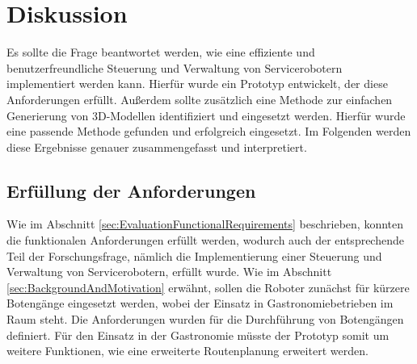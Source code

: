 \newpage
\section{Diskussion}
Es sollte die Frage beantwortet werden, wie eine effiziente und benutzerfreundliche Steuerung und Verwaltung von Servicerobotern implementiert werden kann. Hierfür wurde ein Prototyp entwickelt, der diese Anforderungen erfüllt. Außerdem sollte zusätzlich eine Methode zur einfachen Generierung von 3D-Modellen identifiziert und eingesetzt werden. Hierfür wurde eine passende Methode gefunden und erfolgreich eingesetzt. Im Folgenden werden diese Ergebnisse genauer zusammengefasst und interpretiert.

\subsection{Erfüllung der Anforderungen}
Wie im Abschnitt \ref{sec:EvaluationFunctionalRequirements} beschrieben, konnten die funktionalen Anforderungen erfüllt werden, wodurch auch der entsprechende Teil der Forschungsfrage, nämlich die Implementierung einer Steuerung und Verwaltung von Servicerobotern, erfüllt wurde. Wie im Abschnitt \ref{sec:BackgroundAndMotivation} erwähnt, sollen die Roboter zunächst für kürzere Botengänge eingesetzt werden, wobei der Einsatz in Gastronomiebetrieben im Raum steht. Die Anforderungen wurden für die Durchführung von Botengängen definiert. Für den Einsatz in der Gastronomie müsste der Prototyp somit um weitere Funktionen, wie eine erweiterte Routenplanung erweitert werden.

